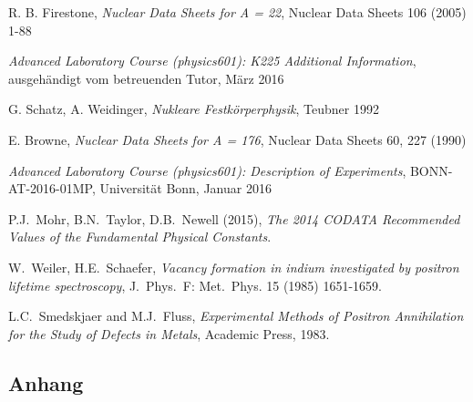 \documentclass[11pt, a4paper]{article}
\numberwithin{equation}{section}
\begin{document}
\FloatBarrier
\vspace{\fill}
\begin{thebibliography}{19}
	R. B. Firestone, \emph{Nuclear Data Sheets for A = 22}, Nuclear Data Sheets 106 (2005) 1-88
	
	\emph{Advanced Laboratory Course (physics601): K225 Additional Information}, ausgehändigt vom betreuenden Tutor, März 2016
	
	G. Schatz, A. Weidinger, \emph{Nukleare Festkörperphysik}, Teubner 1992
	
	E. Browne, \emph{Nuclear Data Sheets for A = 176}, Nuclear Data Sheets 60, 227 (1990)
	
	\emph{Advanced Laboratory Course (physics601): Description of Experiments}, BONN-AT-2016-01MP, Universität Bonn, Januar 2016

	P.J.\ Mohr, B.N.\ Taylor, D.B.\ Newell (2015),
	\emph{The 2014 CODATA Recommended Values of the Fundamental Physical Constants}.

	W.\ Weiler, H.E.\ Schaefer,
	\emph{Vacancy formation in indium investigated by positron lifetime spectroscopy},
	J.\ Phys.\ F: Met.\ Phys. 15 (1985) 1651-1659.

	L.C.\ Smedskjaer and M.J.\ Fluss,
	\emph{Experimental Methods of Positron Annihilation for the Study of Defects in Metals},
	Academic Press, 1983.
	
\end{thebibliography}

\begin{appendix}
\newpage
\section{Anhang}


\end{appendix}
\end{document}
